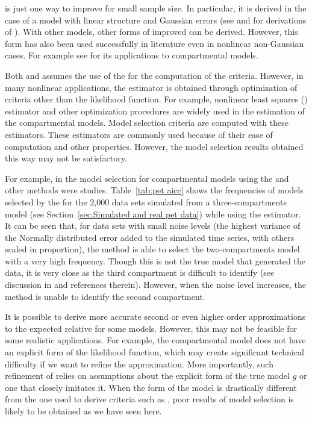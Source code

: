 \aicc is just one way to improve \aic for small sample size. In particular,
it is derived in the case of a model with linear structure and Gaussian
errors (see \cite{Hurvich:1989ev} and \cite[][sec.~6.4.1]{Burnham:2002wc} for
derivations of \aicc). With other models, other forms of improved \aic can be
derived. However, this form has also been used successfully in literature
even in nonlinear non-Gaussian cases. For example see
\cite{Turkheimer:2003iy} for its applications to \pet compartmental models.

Both \aic and \aicc assumes the use of the \mle for the computation of the
criteria. However, in many nonlinear applications, the estimator is obtained
through optimization of criteria other than the likelihood function. For
example, nonlinear least squares (\nls) estimator and other optimization
procedures are widely used in the estimation of the \pet compartmental
models. Model selection criteria are computed with these estimators. These
estimators are commonly used because of their ease of computation and other
properties. However, the model selection results obtained this way may not be
satisfactory.

For example, in \cite{Zhou2013} the model selection for \pet compartmental
models using the \aic and other methods were studies. Table~\ref{tab:pet
aicc} shows the frequencies of models selected by the \aicc for the 2,000
data sets simulated from a three-compartments model (see
Section~\ref{sec:Simulated and real pet data}) while using the \nls
estimator. It can be seen that, for data sets with small noise levels (the
highest variance of the Normally distributed error added to the simulated
time series, with others scaled in proportion), the \aicc method is able to
select the two-compartments model with a very high frequency. Though this is
not the true model that generated the data, it is very close as the third
compartment is difficult to identify (see discussion in \cite{Zhou2013} and
references therein). However, when the noise level increases, the method is
unable to identify the second compartment.



It is possible to derive more accurate second or even higher order
approximations to the expected relative \kld for some models. However, this
may not be feasible for some realistic applications. For example, the \pet
compartmental model does not have an explicit form of the likelihood
function, which may create significant technical difficulty if we want to
refine the \aic approximation. More importantly, such refinement of \aic
relies on assumptions about the explicit form of the true model $g$ or one
that closely imitates it. When the form of the model is drastically different
from the one used to derive criteria such as \aicc, poor results of model
selection is likely to be obtained as we have seen here.

